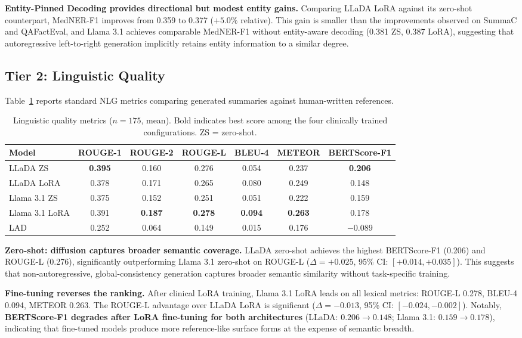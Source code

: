 \documentclass[11pt]{article}
\begin{document}
\textbf{Entity-Pinned Decoding provides directional but modest entity gains.}
Comparing LLaDA LoRA against its zero-shot counterpart, MedNER-F1 improves
from 0.359 to 0.377 ($+5.0\%$ relative). This gain is smaller than the
improvements observed on SummaC and QAFactEval, and Llama 3.1 achieves
comparable MedNER-F1 without entity-aware decoding (0.381 ZS, 0.387 LoRA),
suggesting that autoregressive left-to-right generation implicitly retains
entity information to a similar degree.

\subsection{Tier 2: Linguistic Quality}

Table~\ref{tab:quality} reports standard NLG metrics comparing generated
summaries against human-written references.

\begin{table}[htbp]
\small
\centering
\begin{tabular}{lcccccc}
\hline
\textbf{Model} & \textbf{ROUGE-1} & \textbf{ROUGE-2} & \textbf{ROUGE-L} & \textbf{BLEU-4} & \textbf{METEOR} & \textbf{BERTScore-F1} \\
\hline
LLaDA ZS   & \textbf{0.395} & 0.160 & 0.276 & 0.054 & 0.237 & \textbf{0.206} \\
LLaDA LoRA & 0.378 & 0.171 & 0.265 & 0.080 & 0.249 & 0.148 \\
Llama 3.1 ZS  & 0.375 & 0.152 & 0.251 & 0.051 & 0.222 & 0.159 \\
Llama 3.1 LoRA & 0.391 & \textbf{0.187} & \textbf{0.278} & \textbf{0.094} & \textbf{0.263} & 0.178 \\
\hline
LAD        & 0.252 & 0.064 & 0.149 & 0.015 & 0.176 & $-0.089$ \\
\hline
\end{tabular}
\caption{Linguistic quality metrics ($n=175$, mean). Bold indicates best score among the four clinically trained configurations. ZS = zero-shot.}
\label{tab:quality}
\end{table}

\textbf{Zero-shot: diffusion captures broader semantic coverage.}
LLaDA zero-shot achieves the highest BERTScore-F1 (0.206) and ROUGE-L
(0.276), significantly outperforming Llama 3.1 zero-shot on ROUGE-L
($\Delta = +0.025$, 95\% CI: $[+0.014, +0.035]$). This suggests that
non-autoregressive, global-consistency generation captures broader semantic
similarity without task-specific training.

\textbf{Fine-tuning reverses the ranking.}
After clinical LoRA training, Llama 3.1 LoRA leads on all lexical metrics:
ROUGE-L 0.278, BLEU-4 0.094, METEOR 0.263.
The ROUGE-L advantage over LLaDA LoRA is significant
($\Delta = -0.013$, 95\% CI: $[-0.024, -0.002]$).
Notably, \textbf{BERTScore-F1 degrades after LoRA fine-tuning for both
architectures} (LLaDA: $0.206 \rightarrow 0.148$; Llama 3.1:
$0.159 \rightarrow 0.178$), indicating that fine-tuned models produce more
reference-like surface forms at the expense of semantic breadth.
\end{document}
